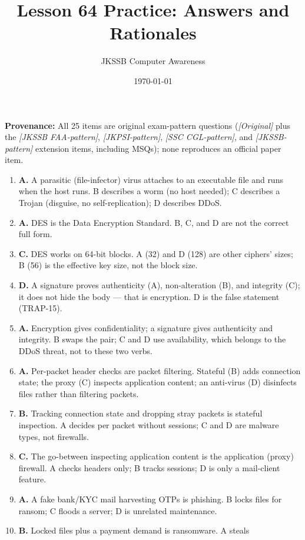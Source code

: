 \documentclass[11pt]{article}
\title{Lesson 64 Practice: Answers and Rationales}
\author{JKSSB Computer Awareness}
\date{\today}
\begin{document}
\maketitle
\noindent\textbf{Provenance:} All 25 items are original exam-pattern questions (\textit{[Original]} plus the \textit{[JKSSB FAA-pattern]}, \textit{[JKPSI-pattern]}, \textit{[SSC CGL-pattern]}, and \textit{[JKSSB-pattern]} extension items, including MSQs); none reproduces an official paper item.
\begin{enumerate}[label=\textbf{Q\arabic*.}, leftmargin=*]
\item \textbf{A.} A parasitic (file-infector) virus attaches to an executable
  file and runs when the host runs. B describes a worm (no host needed); C
  describes a Trojan (disguise, no self-replication); D describes DDoS.
\item \textbf{A.} DES is the Data Encryption Standard. B, C, and D are not
  the correct full form.
\item \textbf{C.} DES works on 64-bit blocks. A (32) and D (128) are other
  ciphers' sizes; B (56) is the effective key size, not the block size.
\item \textbf{D.} A signature proves authenticity (A), non-alteration (B),
  and integrity (C); it does not hide the body --- that is encryption. D is
  the false statement (TRAP-15).
\item \textbf{A.} Encryption gives confidentiality; a signature gives
  authenticity and integrity. B swaps the pair; C and D use availability,
  which belongs to the DDoS threat, not to these two verbs.
\item \textbf{A.} Per-packet header checks are packet filtering. Stateful (B)
  adds connection state; the proxy (C) inspects application content; an
  anti-virus (D) disinfects files rather than filtering packets.
\item \textbf{B.} Tracking connection state and dropping stray packets is
  stateful inspection. A decides per packet without sessions; C and D are
  malware types, not firewalls.
\item \textbf{C.} The go-between inspecting application content is the
  application (proxy) firewall. A checks headers only; B tracks sessions; D
  is only a mail-client feature.
\item \textbf{A.} A fake bank/KYC mail harvesting OTPs is phishing. B locks
  files for ransom; C floods a server; D is unrelated maintenance.
\item \textbf{B.} Locked files plus a payment demand is ransomware. A steals

\end{enumerate}
\end{document}
